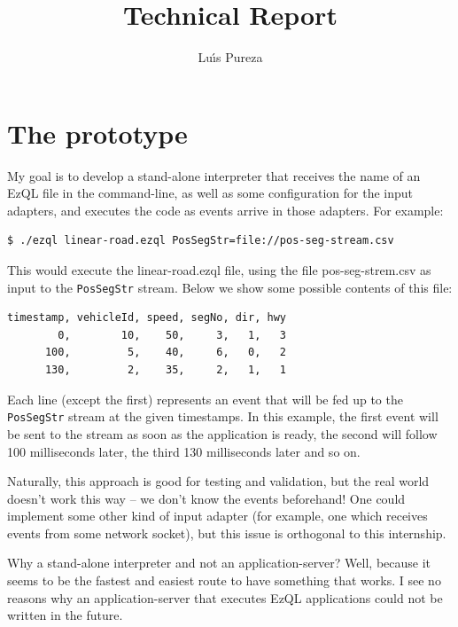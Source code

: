 \documentclass{report}
\begin{document}
\title{Technical Report}
\author{Lu\'{\i}s Pureza}

\maketitle

\tableofcontents

\addtolength{\parskip}{\baselineskip}

\chapter{The prototype}

My goal is to develop a stand-alone interpreter that receives the name
of an EzQL file in the command-line, as well as some configuration for
the input adapters, and executes the code as events arrive in those
adapters. For example:

\begin{verbatim}
$ ./ezql linear-road.ezql PosSegStr=file://pos-seg-stream.csv
\end{verbatim}

This would execute the linear-road.ezql file, using the file
pos-seg-strem.csv as input to the \verb=PosSegStr= stream. Below we
show some possible contents of this file:

\begin{verbatim}
timestamp, vehicleId, speed, segNo, dir, hwy
        0,        10,    50,     3,   1,   3
      100,         5,    40,     6,   0,   2
      130,         2,    35,     2,   1,   1
\end{verbatim}

Each line (except the first) represents an event that will be fed up
to the \verb=PosSegStr= stream at the given timestamps. In this
example, the first event will be sent to the stream as soon as the
application is ready, the second will follow 100 milliseconds later,
the third 130 milliseconds later and so on.

Naturally, this approach is good for testing and validation, but the
real world doesn't work this way -- we don't know the events
beforehand! One could implement some other kind of input adapter (for
example, one which receives events from some network socket), but this
issue is orthogonal to this internship.

Why a stand-alone interpreter and not an application-server? Well,
because it seems to be the fastest and easiest route to have something
that works. I see no reasons why an application-server that executes
EzQL applications could not be written in the future.
\end{document}

